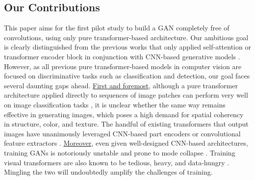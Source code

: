 \documentclass{article}
\begin{document}
\subsection{Our Contributions}
This paper aims for the first pilot study to build a GAN completely free of convolutions, using only pure transformer-based architecture. Our ambitious goal is clearly distinguished from the previous works that only applied self-attention or transformer encoder block in conjunction with CNN-based generative models \cite{zhang2019self,esser2020taming}. However, as all previous pure transformer-based models in computer vision are focused on discriminative tasks such as classification and detection, our goal faces several daunting gaps ahead. \underline{First and foremost}, although a pure transformer architecture applied directly to sequences of image patches can perform very well on image classification tasks \cite{dosovitskiy2020image}, it is unclear whether the same way remains effective in generating images, which poses a high demand for spatial coherency in structure, color, and texture. The handful of existing transformers that output images have unanimously leveraged CNN-based part encoders \cite{esser2020taming} or convolutional feature extractors \cite{yang2020learning,chen2020pre}. \underline{Moreover}, even given well-designed CNN-based architectures, training GANs is notoriously unstable and prone to mode collapse \cite{salimans2016improved}. Training visual transformers are also known to be tedious, heavy, and data-hungry \cite{dosovitskiy2020image}. Mingling the two will undoubtedly amplify the challenges of training. 
\end{document}

